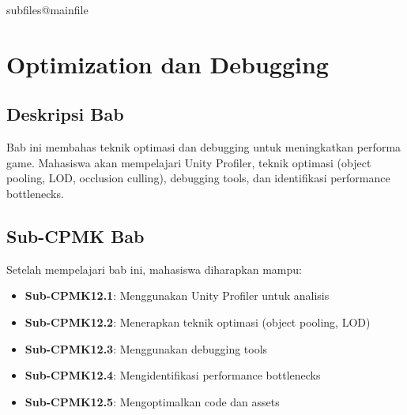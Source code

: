 \documentclass[../../main.tex]{subfiles}
\begin{document}
\ifcsname subfiles@mainfile\endcsname\else
    \setcounter{chapter}{11}
\fi
\chapter{Optimization dan Debugging}

\section{Deskripsi Bab}

Bab ini membahas teknik optimasi dan debugging untuk meningkatkan performa game. Mahasiswa akan mempelajari Unity Profiler, teknik optimasi (object pooling, LOD, occlusion culling), debugging tools, dan identifikasi performance bottlenecks.

\section{Sub-CPMK Bab}

Setelah mempelajari bab ini, mahasiswa diharapkan mampu:
\begin{itemize}
\item \textbf{Sub-CPMK12.1}: Menggunakan Unity Profiler untuk analisis
\item \textbf{Sub-CPMK12.2}: Menerapkan teknik optimasi (object pooling, LOD)
\item \textbf{Sub-CPMK12.3}: Menggunakan debugging tools
\item \textbf{Sub-CPMK12.4}: Mengidentifikasi performance bottlenecks
\item \textbf{Sub-CPMK12.5}: Mengoptimalkan code dan assets
\end{itemize}









\end{document}
